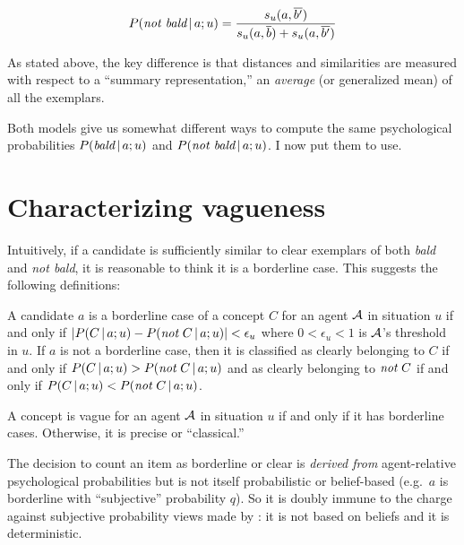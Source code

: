 \[ P(\emph{not bald} \,|\, a; u) = \frac{s_u(a, \overline{b'})}{s_u(a, \overline{b}) + s_u(a, \overline{b'})} \]

As stated above, the key difference is that distances and similarities are measured with respect to a ``summary representation,'' an \emph{average} (or generalized mean) of all the exemplars.

Both models give us somewhat different ways to compute the same psychological probabilities $P(\emph{bald} \,|\, a; u)$ and $P(\emph{not bald} \,|\, a; u)$. I now put them to use.


\section{Characterizing vagueness}

Intuitively, if a candidate is sufficiently similar to clear exemplars of both \emph{bald} and \emph{not bald}, it is reasonable to think it is a borderline case. This suggests the following definitions:

\begin{definition}

A candidate $a$ is a borderline case of a concept $C$ for an agent $\cal A$ in situation $u$ if and only if $|P(C \,|\, a; u) - P(\emph{not}\ C \,|\, a; u)| < \epsilon_u$ where $0 < \epsilon_u < 1$ is $\cal A$'s threshold in $u$. If $a$ is not a borderline case, then it is classified as clearly belonging to $C$ if and only if $P(C \,|\, a; u) > P(\emph{not}\ C \,|\, a; u)$ and as clearly belonging to $\emph{not}\ C$ if and only if $P(C \,|\, a; u) < P(\emph{not}\ C \,|\, a; u)$.
\label{def:base} 
\end{definition}


\begin{definition}

A concept is vague for an agent $\cal A$ in situation $u$ if and only if it has borderline cases. Otherwise, it is precise or ``classical.''

\end{definition}

The decision to count an item as borderline or clear is \emph{derived from} agent-relative psychological probabilities but is not itself probabilistic or belief-based (e.g.\  $a$ is borderline with ``subjective'' probability $q$). So it is doubly immune to the charge against subjective probability views made by \citet[Chapter~5]{schiffer:tm}: it is not based on beliefs and it is deterministic. 

